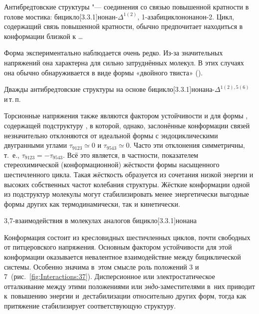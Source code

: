 Антибредтовские структуры "--- соединения со связью повышенной кратности в голове мостика: бицикло[3.3.1]нонан-$\Delta^{1(2)}$, 1-азабицикло\-[3.3.1]нонанон-2. Цикл, содержащий связь повышенной кратности, обычно предпочитает находиться в конформации близкой к \dots

\begin{center}
   \quad
   \quad 
\end{center}


Форма \BB{} экспериментально наблюдается очень редко. Из-за значительных напряжений она характерна для сильно затруднённых молекул. В этих случаях она обычно обнаруживается в виде формы «двойного твиста» (\TT{}).

Дважды антибредтовские структуры на основе бицикло[3.3.1]нонана-$\Delta^{1(2),5(6)}$  и\,т.\,п.

\begin{center}
   \quad
   \quad {}
\end{center}

Торсионные напряжения также являются фактором устойчивости и для формы \CB{}, содержащей подструктуру , в которой, однако, заслонённые конформации связей незначительно отклоняются от идеальной формы  с эндоциклическими двугранными углами $\tau_{9123}\simeq 0$ и $\tau_{9543}\simeq 0$. Часто эти отклонения симметричны, т. е., $\tau_{9123} = - \tau_{9543}$. Всё это является, в частности, показателем стереохимической (конформационной) жёсткости формы  насыщенного шестичленного цикла. Такая жёсткость образуется из сочетания низкой энергии и высоких собственных частот колебания структуры. Жёсткие конформации одной из подструктур молекулы могут стабилизировать менее энергетически выгодные формы других как термодинамически, так и кинетически.

\begin{center}
\caption{3,7-взаимодействия в молекулах аналогов бицикло[3.3.1]нонана\label{fig:Interactions:37}}
\centerfloat{}
\end{center}

Конформация \CC{} состоит из кресловидных шестичленных циклов, почти свободных от питцеровского напряжения. Основным фактором устойчивости для этой конформации оказывается невалентное взаимодействие между  бициклической системы. Особенно значима в~этом смысле роль положений 3 и 7~(рис.~\ref{fig:Interactions:37}). Дисперсионное или электростатическое отталкивание между этими положениями или \emph{эндо}-заместителями в~них приводит к~повышению энергии и~дестабилизации \CC{} относительно других форм, тогда как притяжение стабилизирует соответствующую структуру.

